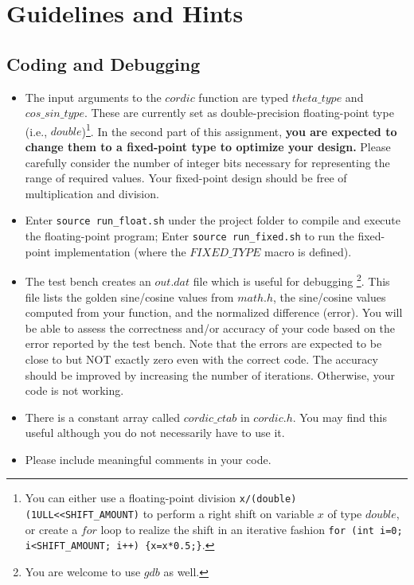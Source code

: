 \documentclass[paper=letter, fontsize=11.6pt]{scrartcl} %
\numberwithin{equation}{section} %
\numberwithin{figure}{section} %
\numberwithin{table}{section} %
\begin{document}
\section{Guidelines and Hints}

\subsection{Coding and Debugging}
\begin{itemize}
	\item The input arguments to the $cordic$ function are typed $theta\_type$ 
	and $cos\_sin\_type$. These are currently set as double-precision floating-point type (i.e., $double$)\footnote{You can either use a floating-point division \texttt{x/(double)(1ULL<<SHIFT\_AMOUNT)} to perform a right shift on variable $x$ of type $double$, or create a $for$ loop to realize the shift in an iterative fashion \texttt{for (int i=0; i<SHIFT\_AMOUNT; i++) \{x=x*0.5;\}}.}. In the second part of this assignment, \textbf{you are expected to change them to a fixed-point type to optimize your design.} Please carefully consider the number of integer bits necessary for representing the range of required values. Your fixed-point design should be free of multiplication and division.

    \item Enter \texttt{source run\_float.sh} under the project folder to compile and execute the floating-point program; Enter \texttt{source run\_fixed.sh} to run the fixed-point implementation (where the $FIXED\_TYPE$ macro is defined).

	\item The test bench creates an $out.dat$ file which is useful for debugging \footnote{You are welcome to use $gdb$ as well.}. This file lists the golden sine/cosine values from $math.h$, the sine/cosine values computed from your function, and the normalized difference (error). You will be able to assess the correctness and/or accuracy of your code based on the error reported by the test bench. Note that the errors are expected to be close to but NOT exactly zero even with the correct code. The accuracy should be improved by increasing the number of iterations. Otherwise, your code is not working.
	

	\item There is a constant array called $cordic\_ctab$ in $cordic.h$. You may find this useful although you do not necessarily have to use it.

	\item Please include meaningful comments in your code.
\end{itemize}
\end{document}
